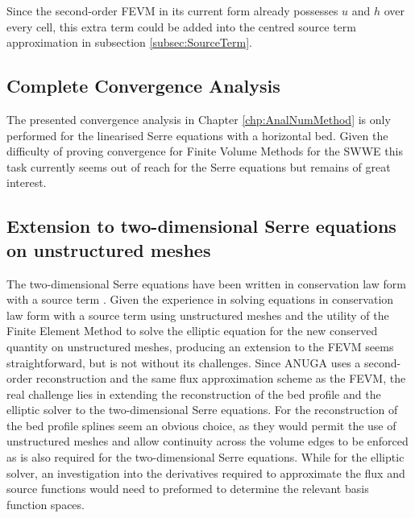 Since the second-order FEVM in its current form already possesses $u$ and $h$ over every cell, this extra term could be added into the centred source term approximation in subsection \ref{subsec:SourceTerm}. 

\subsection{Complete Convergence Analysis}
The presented convergence analysis in Chapter \ref{chp:AnalNumMethod} is only performed for the linearised Serre equations with a horizontal bed. Given the difficulty of proving convergence for Finite Volume Methods for the SWWE \cite{LeVeque-2002} this task currently seems out of reach for the Serre equations but remains of great interest.

\subsection{Extension to two-dimensional Serre equations on unstructured meshes}
The two-dimensional Serre equations have been written in conservation law form with a source term \cite{Zoppou-2014}. Given the experience in solving equations in conservation law form with a source term \cite{ANUGA,ClawPack} using unstructured meshes and the utility of the Finite Element Method to solve the elliptic equation for the new conserved quantity on unstructured meshes, producing an extension to the FEVM seems straightforward, but is not without its challenges. Since ANUGA \cite{ANUGA} uses a second-order reconstruction and the same flux approximation scheme as the FEVM, the real challenge lies in extending the reconstruction of the bed profile and the elliptic solver to the two-dimensional Serre equations. For the reconstruction of the bed profile splines seem an obvious choice, as they would permit the use of unstructured meshes and allow continuity across the volume edges to be enforced as is also required for the two-dimensional Serre equations. While for the elliptic solver, an investigation into the derivatives required to approximate the flux and source functions would need to preformed to determine the relevant basis function spaces. 




